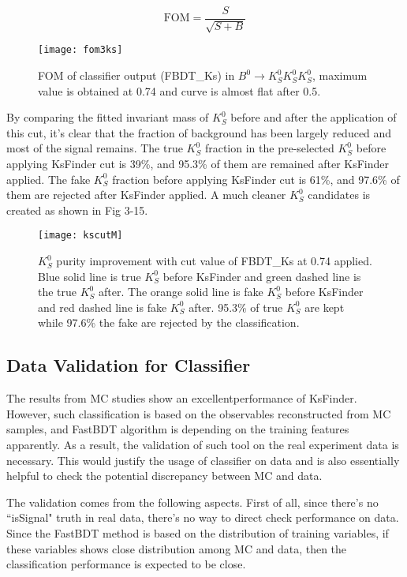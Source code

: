 \begin{equation}
	\text{FOM} = \frac{S}{\sqrt{S+B}}
\end{equation}

\begin{figure}[H]
	\centering
	\texttt{[image: fom3ks]}
	\caption{FOM of classifier output (FBDT\_Ks) in $B^0 \to K_S^0  K_S^0  K_S^0$, maximum value is obtained at 0.74 and curve is almost flat after 0.5.}
\end{figure}

By comparing the fitted invariant mass of $K_S^0$ before and after the application of this cut, it's clear that the fraction of background has been largely reduced and most of the signal remains. The true $K_S^0$ fraction in the pre-selected $K_S^0$ before applying KsFinder cut is 39\%, and 95.3\% of them are remained after KsFinder applied. The fake $K_S^0$ fraction before applying KsFinder cut is 61\%, and 97.6\% of them are rejected after KsFinder applied. A much cleaner $K_S^0$ candidates is created as shown in Fig 3-15. 

\begin{figure}[htpb]
	\centering
	\texttt{[image: kscutM]}
	\caption{$K_S^0$ purity improvement with cut value of FBDT\_Ks at 0.74 applied. Blue solid line is true $K_S^0$ before KsFinder and green dashed line is the true $K_S^0$ after. The orange solid line is fake $K_S^0$ before KsFinder and red dashed line is fake $K_S^0$ after. 95.3\% of true $K_S^0$ are kept while 97.6\% the fake are rejected by the classification. }
\end{figure}

\subsection{Data Validation for Classifier}
The results from MC studies show an excellentperformance of KsFinder. However, such classification is based on the observables reconstructed from MC samples, and FastBDT algorithm is depending on the training features apparently. As a result, the validation of such tool on the real experiment data is necessary. This would justify the usage of classifier on data and is also essentially helpful to check the potential discrepancy between MC and data. 

The validation comes from the following aspects. First of all, since there's no ``isSignal" truth in real data, there's no way to direct check performance on data. Since the FastBDT method is based on the distribution of training variables, if these variables shows close distribution among MC and data, then the classification performance is expected to be close.

